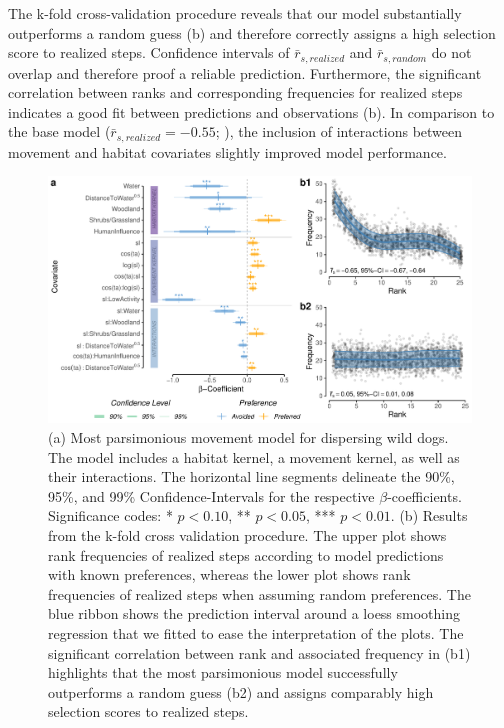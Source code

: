 \documentclass[abstract=on,10pt,a4paper,bibliography=totocnumbered]{article}
\begin{document}
The k-fold cross-validation procedure reveals that our model substantially
outperforms a random guess (b) and therefore correctly
assigns a high selection score to realized steps. Confidence intervals of
\(\bar{r}_{s, realized}\) and \(\bar{r}_{s, random}\) do not overlap and
therefore proof a reliable prediction. Furthermore, the significant correlation
between ranks and corresponding frequencies for realized steps indicates a good
fit between predictions and observations (b). In comparison
to the base model (\(\bar{r}_{s, realized} = -0.55\); \citealp{Hofmann.2021}),
the inclusion of interactions between movement and habitat covariates slightly
improved model performance.

\begin{figure}
  \begin{center}
    \includegraphics[width=\textwidth]{99_MovementModel}
    \caption{(a) Most parsimonious movement model for dispersing wild dogs. The
    model includes a habitat kernel, a movement kernel, as well as their
    interactions. The horizontal line segments delineate the 90\%, 95\%, and
    99\% Confidence-Intervals for the respective \(\beta\)-coefficients.
    Significance codes: * \(p < 0.10\), ** \(p < 0.05\), *** \(p < 0.01\). (b)
    Results from the k-fold cross validation procedure. The upper plot shows
    rank frequencies of realized steps according to model predictions with known
    preferences, whereas the lower plot shows rank frequencies of realized steps
    when assuming random preferences. The blue ribbon shows the prediction
    interval around a loess smoothing regression that we fitted to ease the
    interpretation of the plots. The significant correlation between rank and
    associated frequency in (b1) highlights that the most parsimonious model
    successfully outperforms a random guess (b2) and assigns comparably high
    selection scores to realized steps.}
    \label{MovementModel}
  \end{center}
\end{figure}
\end{document}
